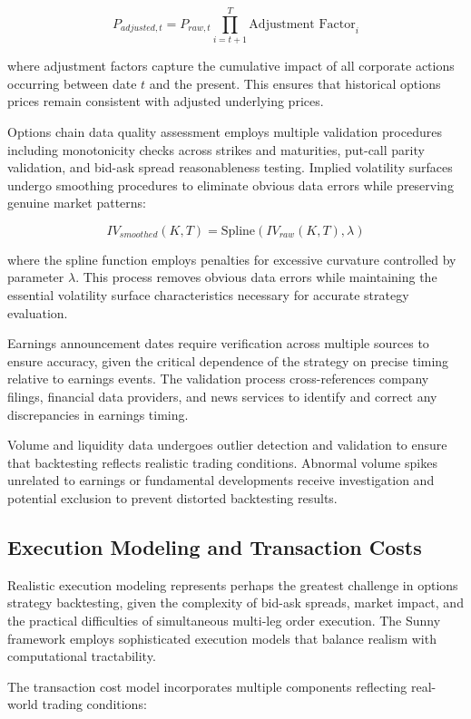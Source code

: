 \documentclass[
  american,
  11pt,
  11pt,
  letterpaper,
  onecolumn]{article}
\begin{document}
\[P_{adjusted,t} = P_{raw,t} \prod_{i=t+1}^{T} \text{Adjustment Factor}_i\]

where adjustment factors capture the cumulative impact of all corporate
actions occurring between date \(t\) and the present. This ensures that
historical options prices remain consistent with adjusted underlying
prices.

Options chain data quality assessment employs multiple validation
procedures including monotonicity checks across strikes and maturities,
put-call parity validation, and bid-ask spread reasonableness testing.
Implied volatility surfaces undergo smoothing procedures to eliminate
obvious data errors while preserving genuine market patterns:

\[IV_{smoothed}(K,T) = \text{Spline}(IV_{raw}(K,T), \lambda)\]

where the spline function employs penalties for excessive curvature
controlled by parameter \(\lambda\). This process removes obvious data
errors while maintaining the essential volatility surface
characteristics necessary for accurate strategy evaluation.

Earnings announcement dates require verification across multiple sources
to ensure accuracy, given the critical dependence of the strategy on
precise timing relative to earnings events. The validation process
cross-references company filings, financial data providers, and news
services to identify and correct any discrepancies in earnings timing.

Volume and liquidity data undergoes outlier detection and validation to
ensure that backtesting reflects realistic trading conditions. Abnormal
volume spikes unrelated to earnings or fundamental developments receive
investigation and potential exclusion to prevent distorted backtesting
results.

\subsection{Execution Modeling and Transaction
Costs}\label{execution-modeling-and-transaction-costs}

Realistic execution modeling represents perhaps the greatest challenge
in options strategy backtesting, given the complexity of bid-ask
spreads, market impact, and the practical difficulties of simultaneous
multi-leg order execution. The Sunny framework employs sophisticated
execution models that balance realism with computational tractability.

The transaction cost model incorporates multiple components reflecting
real-world trading conditions:
\end{document}
